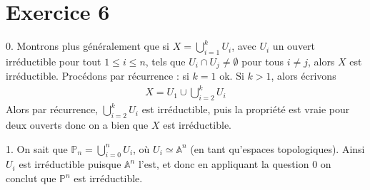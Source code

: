     \section{Exercice 6}
        \begin{question}{0.}
            Montrons plus généralement que si $X = \bigcup_{i = 1}^k U_i$, avec $U_i$ un ouvert irréductible pour tout $1 \leq i \leq n$, tels que $U_i \cap U_j \neq \emptyset$ pour tous $i \neq j$, alors $X$ est irréductible. Procédons par récurrence : si $k = 1$ ok. Si $k > 1$, alors écrivons
            \begin{align*}
                X = U_1 \cup \bigcup_{i = 2}^k U_i
            \end{align*}
            Alors par récurrence, $\bigcup_{i = 2}^k U_i$ est irréductible, puis la propriété est vraie pour deux ouverts donc on a bien que $X$ est irréductible.
        \end{question}
        \begin{question}{1.}
            On sait que $\mathbb{P}_n = \bigcup_{i = 0}^n U_i$, où $U_i \simeq \mathbb{A}^n$ (en tant qu'espaces topologiques). Ainsi $U_i$ est irréductible puisque $\mathbb{A}^n$ l'est, et donc en appliquant la question 0 on conclut que $\mathbb{P}^n$ est irréductible.
        \end{question}
